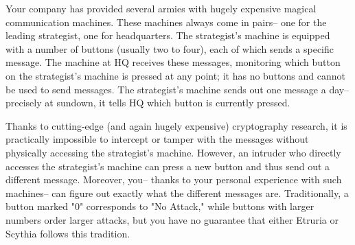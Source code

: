 \documentclass[green]{Kos}
\begin{document}
\name{\gMachine{}}

Your company has provided several armies with hugely expensive magical communication machines. These machines always come in pairs-- one for the leading strategist, one for headquarters. The strategist's machine is equipped with a number of buttons (usually two to four), each of which sends a specific message. The machine at HQ receives these messages, monitoring which button on the strategist's machine is pressed at any point; it has no buttons and cannot be used to send messages. The strategist's machine sends out one message a day-- precisely at sundown, it tells HQ which button is currently pressed.

Thanks to cutting-edge (and again hugely expensive) cryptography research, it is practically impossible to intercept or tamper with the messages without physically accessing the strategist's machine. However, an intruder who directly accesses the strategist's machine can press a new button and thus send out a different message. Moreover, you-- thanks to your personal experience with such machines-- can figure out exactly what the different messages are. Traditionally, a button marked "0" corresponds to "No Attack," while buttons with larger numbers order larger attacks, but you have no guarantee that either Etruria or Scythia follows this tradition.
\end{document}
